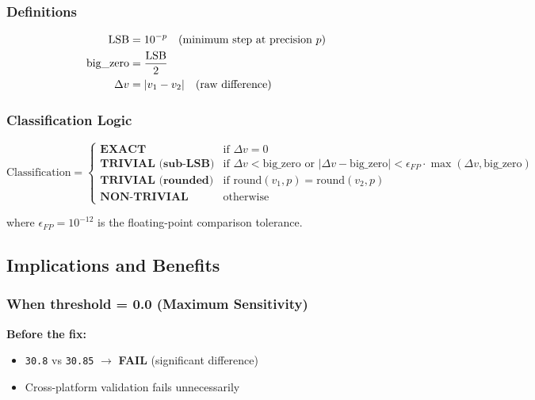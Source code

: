 \subsubsection{Definitions}

\begin{align}
    \mathrm{LSB} &= 10^{-p} \quad \text{(minimum step at precision } p \text{)} \\
    \text{big\_zero} &= \frac{\mathrm{LSB}}{2} \\
    \Delta v &= |v_1 - v_2| \quad \text{(raw difference)}
\end{align}

\subsubsection{Classification Logic}

\begin{equation}
    \text{Classification} = \begin{cases}
        \textbf{EXACT} & \text{if } \Delta v = 0 \\
        \textbf{TRIVIAL (sub-LSB)} & \text{if } \Delta v < \text{big\_zero} \text{ or } |\Delta v - \text{big\_zero}| < \epsilon_{FP} \cdot \max(\Delta v, \text{big\_zero}) \\
        \textbf{TRIVIAL (rounded)} & \text{if } \text{round}(v_1, p) = \text{round}(v_2, p) \\
        \textbf{NON-TRIVIAL} & \text{otherwise}
    \end{cases}
\end{equation}

where $\epsilon_{FP} = 10^{-12}$ is the floating-point comparison tolerance.

\subsection{Implications and Benefits}

\subsubsection{When threshold = 0.0 (Maximum Sensitivity)}

\textbf{Before the fix:}
\begin{itemize}
    \item \texttt{30.8} vs \texttt{30.85} $\to$ \textbf{FAIL} (significant difference)
    \item Cross-platform validation fails unnecessarily
\end{itemize}

